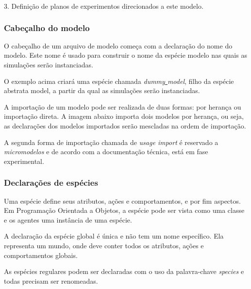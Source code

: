 3. Definição de planos de experimentos direcionados a este modelo.

\subsubsection{Cabeçalho do modelo}

O cabeçalho de um arquivo de modelo começa com a declaração do nome do modelo. Este nome é usado para construir o nome da espécie modelo nas quais as simulações serão instanciadas.


O exemplo acima criará uma espécie chamada \textit{dummy\underline{ }model}, filho da espécie abstrata model, a partir da qual as simulações serão instanciadas. 

A importação de um modelo pode ser realizada de duas formas: por herança ou importação direta. A imagem abaixo importa dois modelos por herança, ou seja, as declarações dos modelos importados serão mescladas na ordem de importação.


A segunda forma de importação chamada de \textit{usage import } é reservado a \textit{micromodelos} e de acordo com a documentação técnica, está em fase experimental.





\subsubsection{Declarações de espécies}

Uma espécie define seus atributos, ações e comportamentos, e por fim aspectos. Em Programação Orientada a Objetos, a espécie pode ser vista como uma classe e os agentes uma instância de uma espécie. 

A declaração da espécie global é única e não tem um nome específico. Ela representa um mundo, onde deve conter todos os atributos, ações e comportamentos globais.


As espécies regulares podem ser declaradas com o uso da palavra-chave \textit{species} e todas precisam ser renomeadas.


